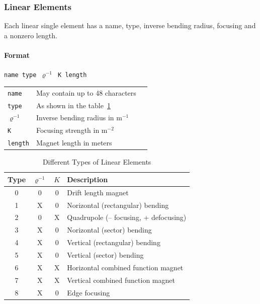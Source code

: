 \subsubsection{Linear Elements} \label{LinEle}

Each linear single element has a name, type, inverse bending radius, focusing and a nonzero length.

\paragraph{Format} \texttt{name type $ \varrho^{-1} $ K length}

\bigskip
\begin{tabular}{@{}lp{0.8\linewidth}}
    \texttt{name} & May contain up to 48 characters \\
    \texttt{type} & As shown in the table~\ref{T-LinEle} \\
    \texttt{$ \varrho^{-1}$} &  Inverse bending radius in $\mathrm{m}^{-1}$ \\
    \texttt{K} & Focusing strength in $\mathrm{m}^{-2}$ \\
    \texttt{length} & Magnet length in meters
\end{tabular}

\begin{table}[h]
    \caption{Different Types of Linear Elements}
    \label{T-LinEle}
    \centering
    \begin{tabular}{|c|c|c|l|}
        \hline
        \rowcolor{blue!30}
        Type & $ \varrho^{-1} $ & $K$ & Description \\
        \hline
        0 & 0 & 0 & Drift length magnet \\
        1 & X & 0 & Norizontal (rectangular) bending \\
        2 & 0 & X & Quadrupole (-- focusing, + defocusing) \\
        3 & X & 0 & Norizontal (sector) bending \\
        4 & X & 0 & Vertical (rectangular) bending \\
        5 & X & 0 & Vertical (sector) bending \\
        6 & X & X & Horizontal combined function magnet \\
        7 & X & X & Vertical combined function magnet \\
        8 & X & 0 & Edge focusing \\
        \hline
    \end{tabular}
\end{table}

